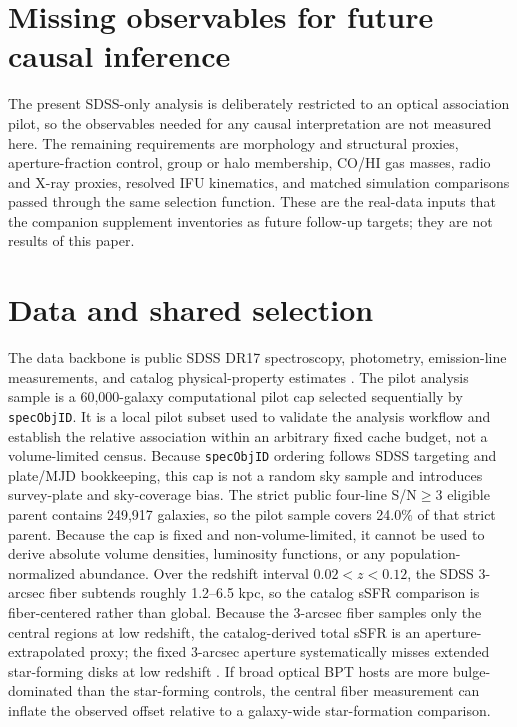 \documentclass[twocolumn]{aastex631}
\begin{document}
\section{Missing observables for future causal inference}
The present SDSS-only analysis is deliberately restricted to an optical association pilot, so the observables needed for any causal interpretation are not measured here. The remaining requirements are morphology and structural proxies, aperture-fraction control, group or halo membership, CO/HI gas masses, radio and X-ray proxies, resolved IFU kinematics, and matched simulation comparisons passed through the same selection function. These are the real-data inputs that the companion supplement inventories as future follow-up targets; they are not results of this paper.

\section{Data and shared selection}
The data backbone is public SDSS DR17 spectroscopy, photometry, emission-line measurements, and catalog physical-property estimates \citep{york2000,sdssdr17,brinchmann2004}. The pilot analysis sample is a 60,000-galaxy computational pilot cap selected sequentially by \texttt{specObjID}. It is a local pilot subset used to validate the analysis workflow and establish the relative association within an arbitrary fixed cache budget, not a volume-limited census. Because \texttt{specObjID} ordering follows SDSS targeting and plate/MJD bookkeeping, this cap is not a random sky sample and introduces survey-plate and sky-coverage bias. The strict public four-line S/N$\geq3$ eligible parent contains 249,917 galaxies, so the pilot sample covers 24.0\% of that strict parent. Because the cap is fixed and non-volume-limited, it cannot be used to derive absolute volume densities, luminosity functions, or any population-normalized abundance.
Over the redshift interval $0.02<z<0.12$, the SDSS 3-arcsec fiber subtends roughly 1.2--6.5 kpc, so the catalog sSFR comparison is fiber-centered rather than global.
Because the 3-arcsec fiber samples only the central regions at low redshift, the catalog-derived total sSFR is an aperture-extrapolated proxy; the fixed 3-arcsec aperture systematically misses extended star-forming disks at low redshift \citep{kewley2005}. If broad optical BPT hosts are more bulge-dominated than the star-forming controls, the central fiber measurement can inflate the observed offset relative to a galaxy-wide star-formation comparison.
\end{document}
